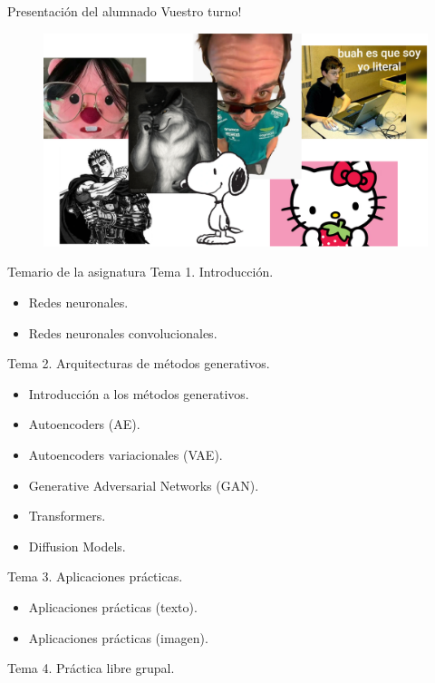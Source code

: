 \begin{frame}{Presentación del alumnado}
\centering \alert{\Large Vuestro turno!}
\begin{figure}
    \centering
    \includegraphics[width=\textwidth]{figures/Presentacion/Presentacion_Alumnos.png}
\end{figure}
\end{frame}

\begin{frame}[allowframebreaks]{Temario de la asignatura}
\alert{\Large Tema 1. Introducción.}
\begin{itemize}
\item Redes neuronales.
\item Redes neuronales convolucionales.
\end{itemize}

\alert{\Large Tema 2. Arquitecturas de métodos generativos.}
\begin{itemize}
\item Introducción a los métodos generativos.
\item Autoencoders (AE).
\item Autoencoders variacionales (VAE).
\item Generative Adversarial Networks (GAN).
\item Transformers.
\item Diffusion Models.
\end{itemize}

\framebreak

\alert{\Large Tema 3. Aplicaciones prácticas.}
\begin{itemize}
\item Aplicaciones prácticas (texto).
\item Aplicaciones prácticas (imagen).
\end{itemize}

\alert{\Large Tema 4. Práctica libre grupal.}
\end{frame}


